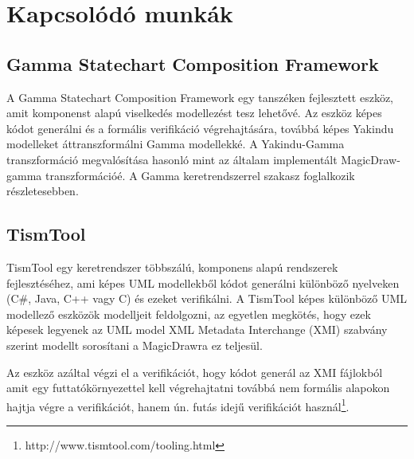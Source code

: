 \chapter{Kapcsolódó munkák}
\label{chap:related-work}
\section{Gamma Statechart Composition Framework}
A Gamma Statechart Composition Framework\cite{gammaf} egy tanszéken fejlesztett eszköz, amit komponenst alapú viselkedés modellezést tesz lehetővé. Az eszköz képes kódot generálni és a formális verifikáció végrehajtására, továbbá képes Yakindu modelleket áttranszformálni Gamma modellekké. A Yakindu-Gamma transzformáció megvalósítása hasonló mint az általam implementált MagicDraw-gamma transzformációé. A Gamma keretrendszerrel  szakasz foglalkozik részletesebben. 

\section{TismTool}

TismTool\cite{veugen2012framework} egy keretrendszer többszálú, komponens alapú rendszerek fejlesztéséhez, ami képes UML modellekből kódot generálni különböző nyelveken (C\#, Java, C++ vagy C) és ezeket verifikálni. A TismTool képes különböző UML modellező eszközök modelljeit feldolgozni, az egyetlen megkötés, hogy ezek képesek legyenek az UML model XML Metadata Interchange (XMI) szabvány szerint modellt sorosítani a MagicDrawra ez teljesül.

Az eszköz azáltal végzi el a verifikációt, hogy kódot generál az XMI fájlokból amit egy futtatókörnyezettel kell végrehajtatni továbbá nem formális alapokon hajtja végre a verifikációt, hanem ún. futás idejű verifikációt használ\footnote{http://www.tismtool.com/tooling.html}.





